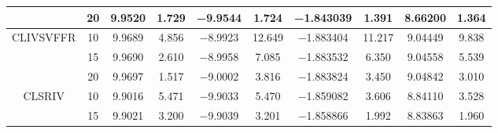 \documentclass{style/presentation}
\begin{document}
\begin{frame}
\begin{table}[!htbp]
\begin{center}
\begin{tabular}{cccccccccc}
                                                            & \num{20} & \num{9.9520}                        & \num{1.729}                            & \num{-9.9544}                       & \num{1.724}                            & \num{-1.843039}                    & \num{1.391}                            & \num{8.66200}                       & \num{1.364}                            \\
                \hline
                \multirow{3}{*}{CLIVSVFFR}                  & \num{10} & \num{9.9689}                        & \num{4.856}                            & \num{-8.9923}                       & \num{12.649}                           & \num{-1.883404}                    & \num{11.217}                           & \num{9.04449}                       & \num{9.838}                            \\
                                                            & \num{15} & \num{9.9690}                        & \num{2.610}                            & \num{-8.9958}                       & \num{7.085}                            & \num{-1.883532}                    & \num{6.350}                            & \num{9.04558}                       & \num{5.539}                            \\
                                                            & \num{20} & \num{9.9697}                        & \num{1.517}                            & \num{-9.0002}                       & \num{3.816}                            & \num{-1.883824}                    & \num{3.450}                            & \num{9.04842}                       & \num{3.010}                            \\
                \hline
                \multirow{3}{*}{CLSRIV}                     & \num{10} & \num{9.9016}                        & \num{5.471}                            & \num{-9.9033}                       & \num{5.470}                            & \num{-1.859082}                    & \num{3.606}                            & \num{8.84110}                       & \num{3.528}                            \\
                                                            & \num{15} & \num{9.9021}                        & \num{3.200}                            & \num{-9.9039}                       & \num{3.201}                            & \num{-1.858866}                    & \num{1.992}                            & \num{8.83863}                       & \num{1.960}                            \\

\end{tabular}
\end{center}
\end{table}
\end{frame}
\end{document}
